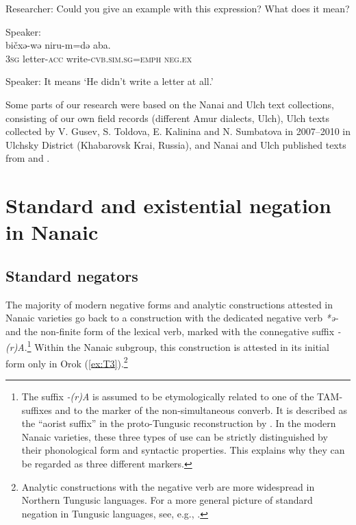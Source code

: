\documentclass[output=paper]{langscibook}
\begin{document}
    Researcher:  {Could you give an example with this expression? What does it mean?} \\
    \medskip

    Speaker:\\
      {bičxə-wə}  {niru-m=də}  {{aba.}} \\
    \textsc{3sg}  letter-\textsc{acc}  write-\textsc{cvb.sim.sg=emph}  {\textsc{neg.ex}} \\
\medskip

    Speaker:  {It means ‘He didn’t write a letter at all.’}
\z
\z

Some parts of our research were based on the Nanai and Ulch text collections, consisting of our own field records (different Amur dialects, Ulch), Ulch texts collected by V. Gusev, S. Toldova, E. Kalinina and N. Sumbatova in 2007–2010 in Ulchsky District (Khabarovsk Krai, Russia), and Nanai and Ulch published texts from \citet{avrorin1986a} and \citet{sunik1985a}.

\section{Standard and existential negation in Nanaic}\label{sec:T4}
\subsection{Standard negators}\label{sec:T4.1}

The majority of modern negative forms and analytic constructions attested in Nanaic varieties go back to a construction with the dedicated negative verb \textit{*ə-} and the non-finite form of the lexical verb, marked with the connegative suffix \textit{-(r)A}.\footnote{\label{footnote:4}The suffix \textit{-(r)A} is assumed to be etymologically related to one of the TAM-suffixes and to the marker of the non-simultaneous converb. It is described as the “aorist suffix” in the proto-Tungusic reconstruction by \citet[124 ff., 146]{benzing1955a}. In the modern Nanaic varieties, these three types of use can be strictly distinguished by their phonological form and syntactic properties. This explains why they can be regarded as three different markers.} Within the Nanaic subgroup, this construction is attested in its initial form only in Orok (\ref{ex:T3}).\footnote{Analytic constructions with the negative verb are more widespread in Northern Tungusic languages. For a more general picture of standard negation in Tungusic languages, see, e.g., \citet{hoelzl2015a}.}
\end{document}
